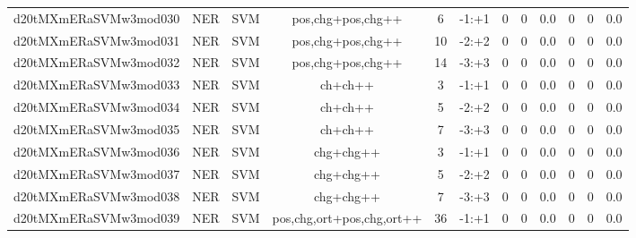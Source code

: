 \documentclass[a4paper]{article}
\begin{document}
\begin{landscape}
\begin{center}
\begin{tabular}{ |c|c|c|c|c|c|c|c|c|c|c|c|}
 
 	
 	\small{ d20tMXmERaSVMw3mod030 } & \small{ NER} & \small{  SVM }  & pos,chg+pos,chg++  &  6 &  \small{  -1:+1 }  &  0 & 0 & 0.0  &  0 & 0 & 0.0 \\
 	

 
 	
 	\small{ d20tMXmERaSVMw3mod031 } & \small{ NER} & \small{  SVM }  & pos,chg+pos,chg++  &  10 &  \small{  -2:+2 }  &  0 & 0 & 0.0  &  0 & 0 & 0.0 \\
 	

 
 	
 	\small{ d20tMXmERaSVMw3mod032 } & \small{ NER} & \small{  SVM }  & pos,chg+pos,chg++  &  14 &  \small{  -3:+3 }  &  0 & 0 & 0.0  &  0 & 0 & 0.0 \\
 	

 
 	
 	\small{ d20tMXmERaSVMw3mod033 } & \small{ NER} & \small{  SVM }  & ch+ch++  &  3 &  \small{  -1:+1 }  &  0 & 0 & 0.0  &  0 & 0 & 0.0 \\
 	

 
 	
 	\small{ d20tMXmERaSVMw3mod034 } & \small{ NER} & \small{  SVM }  & ch+ch++  &  5 &  \small{  -2:+2 }  &  0 & 0 & 0.0  &  0 & 0 & 0.0 \\
 	

 
 	
 	\small{ d20tMXmERaSVMw3mod035 } & \small{ NER} & \small{  SVM }  & ch+ch++  &  7 &  \small{  -3:+3 }  &  0 & 0 & 0.0  &  0 & 0 & 0.0 \\
 	

 
 	
 	\small{ d20tMXmERaSVMw3mod036 } & \small{ NER} & \small{  SVM }  & chg+chg++  &  3 &  \small{  -1:+1 }  &  0 & 0 & 0.0  &  0 & 0 & 0.0 \\
 	

 
 	
 	\small{ d20tMXmERaSVMw3mod037 } & \small{ NER} & \small{  SVM }  & chg+chg++  &  5 &  \small{  -2:+2 }  &  0 & 0 & 0.0  &  0 & 0 & 0.0 \\
 	

 
 	
 	\small{ d20tMXmERaSVMw3mod038 } & \small{ NER} & \small{  SVM }  & chg+chg++  &  7 &  \small{  -3:+3 }  &  0 & 0 & 0.0  &  0 & 0 & 0.0 \\
 	

 
 	
 	\small{ d20tMXmERaSVMw3mod039 } & \small{ NER} & \small{  SVM }  & pos,chg,ort+pos,chg,ort++  &  36 &  \small{  -1:+1 }  &  0 & 0 & 0.0  &  0 & 0 & 0.0 \\
 	


\end{tabular}
\end{center}
\end{landscape}
\end{document}
